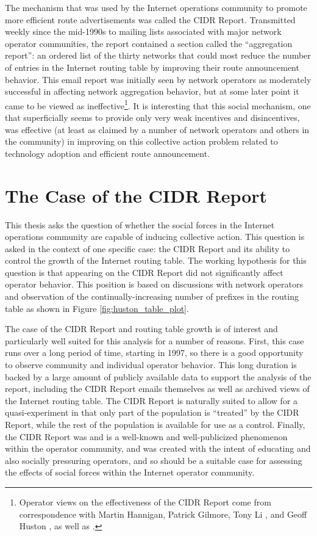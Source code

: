 The mechanism that was used by the Internet operations community to promote more efficient route advertisements was called the CIDR Report. Transmitted weekly since the mid-1990s to mailing lists associated with major network operator communities, the report contained a section called the ``aggregation report'': an ordered list of the thirty networks that could most reduce the number of entries in the Internet routing table by improving their route announcement behavior. This email report was initially seen by network operators as moderately successful in affecting network aggregation behavior, but at some later point it came to be viewed as ineffective\footnote{Operator views on the effectiveness of the CIDR Report come from correspondence with Martin Hannigan, Patrick Gilmore, Tony Li \cite{Li:2011vn}, and Geoff Huston \cite{Huston:2011ys}, as well as \cite{Steenbergen:2010nx}.}. It is interesting that this social mechanism, one that superficially seems to provide only very weak incentives and disincentives, was effective (at least as claimed by a number of network operators and others in the community) in improving on this collective action problem related to technology adoption and efficient route announcement.

\section{The Case of the CIDR Report}

This thesis asks the question of whether the social forces in the Internet operations community are capable of inducing collective action. This question is asked in the context of one specific case: the CIDR Report and its ability to control the growth of the Internet routing table. The working hypothesis for this question is that appearing on the CIDR Report did not significantly affect operator behavior. This position is based on discussions with network operators and observation of the continually-increasing number of prefixes in the routing table as shown in Figure \ref{fig:huston_table_plot}.

The case of the CIDR Report and routing table growth is of interest and particularly well suited for this analysis for a number of reasons. First, this case runs over a long period of time, starting in 1997, so there is a good opportunity to observe community and individual operator behavior. This long duration is backed by a large amount of publicly available data to support the analysis of the report, including the CIDR Report emails themselves as well as archived views of the Internet routing table. The CIDR Report is naturally suited to allow for a quasi-experiment in that only part of the population is ``treated'' by the CIDR Report, while the rest of the population is available for use as a control. Finally, the CIDR Report was and is a well-known and well-publicized phenomenon within the operator community, and was created with the intent of educating and also socially pressuring operators, and so should be a suitable case for assessing the effects of social forces within the Internet operator community.

